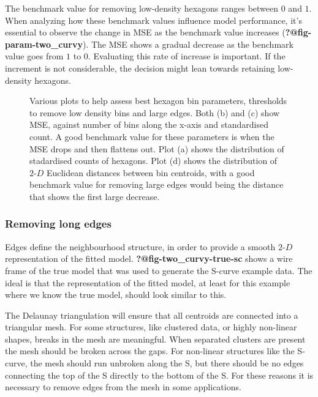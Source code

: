 \documentclass[
  12pt]{article}
\newcommand\gD{$2\text{-}D$}
\begin{document}
The benchmark value for removing low-density hexagons ranges between
\(0\) and \(1\). When analyzing how these benchmark values influence
model performance, it's essential to observe the change in MSE as the
benchmark value increases (\textbf{?@fig-param-two\_curvy}). The MSE
shows a gradual decrease as the benchmark value goes from \(1\) to
\(0\). Evaluating this rate of increase is important. If the increment
is not considerable, the decision might lean towards retaining
low-density hexagons.

\begin{figure}[H]


\caption{\label{fig-param-two-curvy}Various plots to help assess best
hexagon bin parameters, thresholds to remove low density bins and large
edges. Both (b) and (c) show MSE, against number of bins along the
x-axis and standardised count. A good benchmark value for these
parameters is when the MSE drops and then flattens out. Plot (a) shows
the distribution of stadardised counts of hexagons. Plot (d) shows the
distribution of \(2\text{-}D\) Euclidean distances between bin
centroids, with a good benchmark value for removing large edges would
being the distance that shows the first large decrease.}

\end{figure}%

\subsubsection{Removing long edges}\label{removing-long-edges}

Edges define the neighbourhood structure, in order to provide a smooth
\gD{} representation of the fitted model.
\textbf{?@fig-two\_curvy-true-sc} shows a wire frame of the true model
that was used to generate the S-curve example data. The ideal is that
the representation of the fitted model, at least for this example where
we know the true model, should look similar to this.

The Delaunay triangulation will ensure that all centroids are connected
into a triangular mesh. For some structures, like clustered data, or
highly non-linear shapes, breaks in the mesh are meaningful. When
separated clusters are present the mesh should be broken across the
gaps. For non-linear structures like the S-curve, the mesh should run
unbroken along the S, but there should be no edges connecting the top of
the S directly to the bottom of the S. For these reasons it is necessary
to remove edges from the mesh in some applications.
\end{document}
